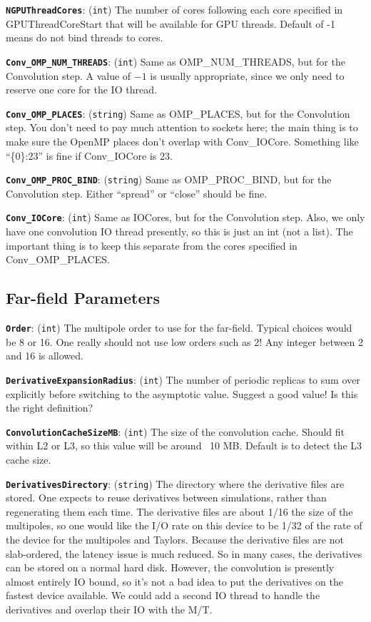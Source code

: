 \documentclass[11pt,preprint]{aastex}
\newcommand{\param}[2]{\medskip\noindent\textbf{\texttt{#1}}: ({\tt #2}) }
\newcommand{\todo}{}
\newcommand{\todo}[1]{{\bf TODO: #1}}
\begin{document}
\param{NGPUThreadCores}{int} The number of cores following each core specified in GPUThreadCoreStart
that will be available for GPU threads.  Default of -1 means do not bind threads to cores.

\param{Conv\_OMP\_NUM\_THREADS}{int} Same as OMP\_NUM\_THREADS, but for the Convolution step.
A value of $-1$ is usually appropriate, since we only need to reserve one core for the IO thread.

\param{Conv\_OMP\_PLACES}{string} Same as OMP\_PLACES, but for the Convolution step.
You don't need to pay much attention to sockets here; the main thing is to make sure
the OpenMP places don't overlap with Conv\_IOCore.  Something like ``\{0\}:23'' is fine if
Conv\_IOCore is 23.

\param{Conv\_OMP\_PROC\_BIND}{string} Same as OMP\_PROC\_BIND, but for the Convolution step.
Either ``spread'' or ``close'' should be fine.

\param{Conv\_IOCore}{int} Same as IOCores, but for the Convolution step.  Also, we only have
one convolution IO thread presently, so this is just an int (not a list).  The important
thing is to keep this separate from the cores specified in Conv\_OMP\_PLACES.



\subsection{Far-field Parameters}

\param{Order}{int} The multipole order to use for the far-field.  Typical
choices would be 8 or 16.  One really should not use low orders such
as 2!  Any integer between 2 and 16 is allowed.

\param{DerivativeExpansionRadius}{int} The number of periodic replicas
to sum over explicitly before switching to the asymptotic value.
\todo{Suggest a good value!}
\todo{Is this the right definition?}

\param{ConvolutionCacheSizeMB}{int} The size of the convolution cache.  Should fit within L2 or L3,
so this value will be around ~10 MB.  Default is to detect the L3 cache size.

\param{DerivativesDirectory}{string} The directory where the derivative
files are stored.  One expects to reuse derivatives between
simulations, rather than regenerating them each time.  The derivative
files are about 1/16 the size of the multipoles, so one would like
the I/O rate on this device to be 1/32 of the rate of the device
for the multipoles and Taylors.  Because the derivative files are
not slab-ordered, the latency issue is much reduced.  So in many
cases, the derivatives can be stored on a normal hard disk.  However,
the convolution is presently almost entirely IO bound, so it's not a
bad idea to put the derivatives on the fastest device available.
\todo{We could add a second IO thread to handle the derivatives and
overlap their IO with the M/T.}
\end{document}

